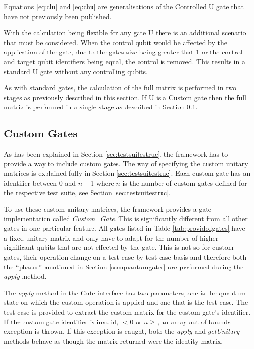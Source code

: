 Equations \ref{eq:clu} and \ref{eq:chu} are generalisations of the Controlled U gate that have not previously been published.

With the calculation being flexible for any gate U there is an additional  scenario that must be considered.
When the control qubit would be affected by the application of the gate, due to the gates size being greater that $1$ or the control and target qubit identifiers being equal, the control is removed.
This results in a standard U gate without any controlling qubits.

As with standard gates, the calculation of the full matrix is performed in two stages as previously described in this section.
If U is a Custom gate then the full matrix is performed in a single stage as described in Section \ref{sec:custgates}.

\subsection{Custom Gates}
\label{sec:custgates}

As has been explained in Section \ref{sec:testsuitestruc}, the framework has to provide a way to include custom gates.
The way of specifying the custom unitary matrices is explained fully in Section \ref{sec:testsuitestruc}.
Each custom gate has an identifier between $0$ and $n-1$ where $n$ is the number of custom gates defined for the respective test suite, see Section \ref{sec:testsuitestruc}.

To use these custom unitary matrices, the framework provides a gate implementation called \emph{Custom\_Gate}.
This is significantly different from all other gates in one particular feature.
All gates listed in Table \ref{tab:providedgates} have a fixed unitary matrix and only have to adapt for the number of higher significant qubits that are not effected by the gate.
This is not so for custom gates, their operation change on a test case by test case basis and therefore both the ``phases'' mentioned in Section \ref{sec:quantumgates} are performed during the \emph{apply} method.

The \emph{apply} method in the Gate interface has two parameters, one is the quantum state on which the custom operation is applied and one that is the test case.
The test case is provided to extract the custom matrix for the custom gate's identifier.
If the custom gate identifier is invalid, $<0$ or $n\geq$, an array out of bounds exception is thrown.
If this exception is caught, both the \emph{apply} and \emph{getUnitary} methods behave as though the matrix returned were the identity matrix.

